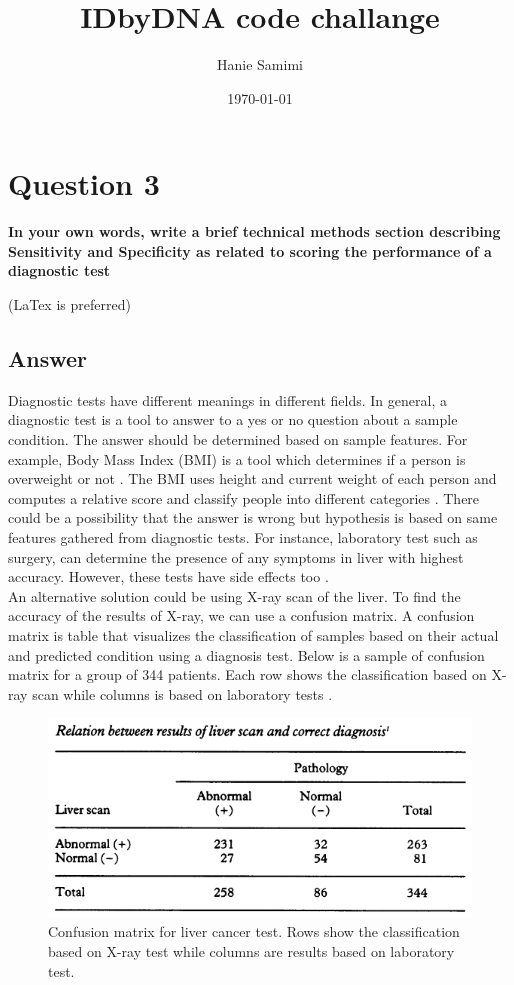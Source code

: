 \documentclass[12pt]{article}
\title{IDbyDNA code challange} %
\author{Hanie Samimi}%
\date{\today} %
\begin{document}
\setlength{\droptitle}{-5em}    
\maketitle


\section*{Question 3}
{\bfseries In your own words, write a brief technical methods section describing Sensitivity and Specificity as related to scoring the performance of a diagnostic test}

(LaTex is preferred)
\subsection*{Answer}
Diagnostic tests have different meanings in different fields. In general, a diagnostic test is
a tool to answer to a yes or no question about a sample condition. The answer should be determined based on sample features. For example, Body Mass Index (BMI) is a tool which determines if a person is overweight or not \cite{BMI}. The BMI uses height and current weight of each person and computes a relative score and classify people into different categories .
There could be a possibility that the answer is wrong but hypothesis is based on same features gathered from diagnostic tests. For instance, laboratory test such as surgery, can determine the presence of any symptoms in liver with highest accuracy. However, these tests have side effects too \cite{biopsy}.\\
An alternative solution could be using X-ray scan of the liver. To find the accuracy of the results of X-ray, we can use a confusion matrix. A confusion matrix is table that visualizes the classification of samples based on their actual and predicted condition using a diagnosis test\cite{CFT}. Below is a sample of confusion matrix for a group of 344 patients. Each row shows the classification based on X-ray scan while columns is based on laboratory tests \cite{table}.   

\begin{figure}
\includegraphics[width=\textwidth]{confusionMatrix.png}
\caption{Confusion matrix for liver cancer test. Rows show the classification based on X-ray test while columns are results based on laboratory test.} \label{fig1}
\end{figure}
\end{document}
